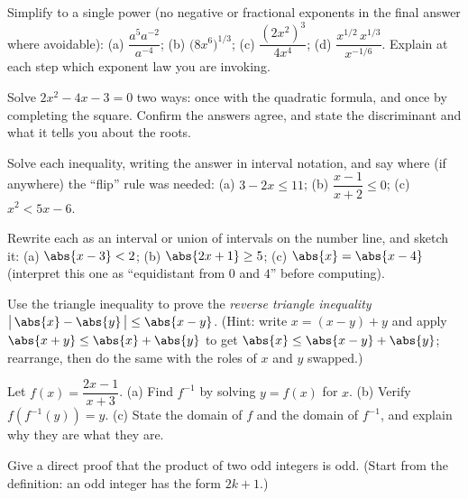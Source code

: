 \begin{exercise}
\label{ch40:exr-exponents}
Simplify to a single power (no negative or fractional exponents in the final
answer where avoidable):
(a) $\dfrac{a^5 a^{-2}}{a^{-4}}$;\quad
(b) $\bigl(8x^6\bigr)^{1/3}$;\quad
(c) $\dfrac{(2x^2)^3}{4x^4}$;\quad
(d) $\dfrac{x^{1/2}\,x^{1/3}}{x^{-1/6}}$.
Explain at each step which exponent law you are invoking.
\end{exercise}

\begin{exercise}
\label{ch40:exr-quadratic}
Solve $2x^2 - 4x - 3 = 0$ two ways: once with the quadratic formula, and once by
completing the square. Confirm the answers agree, and state the discriminant and
what it tells you about the roots.
\end{exercise}

\begin{exercise}
\label{ch40:exr-inequality}
Solve each inequality, writing the answer in interval notation, and say where (if
anywhere) the ``flip'' rule was needed:
(a) $3 - 2x \le 11$;\quad
(b) $\dfrac{x-1}{x+2} \le 0$;\quad
(c) $x^2 < 5x - 6$.
\end{exercise}

\begin{exercise}
\label{ch40:exr-absval}
Rewrite each as an interval or union of intervals on the number line, and sketch
it:
(a) $\abs{x-3} < 2$;\quad
(b) $\abs{2x+1} \ge 5$;\quad
(c) $\abs{x} = \abs{x-4}$ (interpret this one as ``equidistant from $0$ and $4$''
before computing).
\end{exercise}

\begin{exercise}
\label{ch40:exr-triangle}
Use the triangle inequality to prove the \emph{reverse triangle inequality}
$\bigl|\,\abs{x}-\abs{y}\,\bigr| \le \abs{x-y}$.
(Hint: write $x = (x-y) + y$ and apply $\abs{x+y}\le\abs{x}+\abs{y}$ to get
$\abs{x} \le \abs{x-y} + \abs{y}$; rearrange, then do the same with the roles of
$x$ and $y$ swapped.)
\end{exercise}

\begin{exercise}
\label{ch40:exr-inverse}
Let $f(x) = \dfrac{2x-1}{x+3}$.
(a) Find $f^{-1}$ by solving $y = f(x)$ for $x$.
(b) Verify $f(f^{-1}(y)) = y$.
(c) State the domain of $f$ and the domain of $f^{-1}$, and explain why they are
what they are.
\end{exercise}

\begin{exercise}
\label{ch40:exr-direct}
Give a direct proof that the product of two odd integers is odd. (Start from the
definition: an odd integer has the form $2k+1$.)
\end{exercise}

